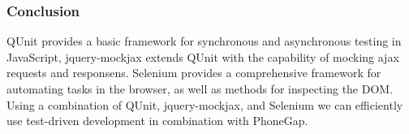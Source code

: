 \subsubsection{Conclusion}

	QUnit provides a basic framework for synchronous and asynchronous testing in
	JavaScript, jquery-mockjax extends QUnit with the capability of mocking ajax
	requests and responsens. Selenium provides a comprehensive framework for
	automating tasks in the browser, as well as methods for inspecting the DOM.
	Using a combination of QUnit, jquery-mockjax, and Selenium we can
	efficiently use test-driven development in combination with PhoneGap.
